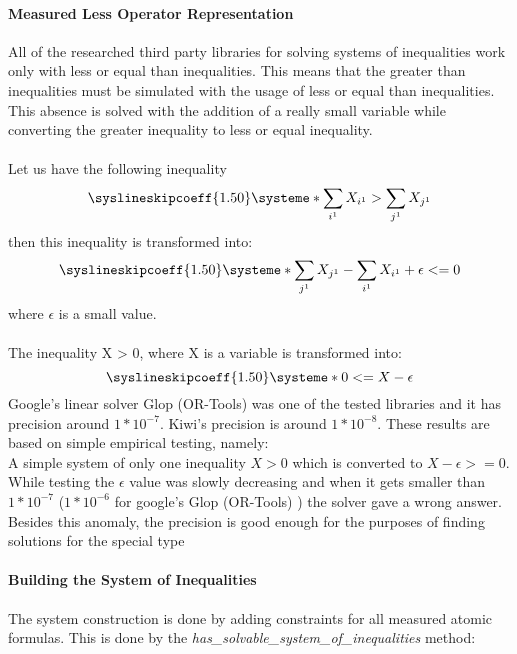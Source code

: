 \documentclass{article}
\begin{document}
	\paragraph{Measured Less Operator Representation}
	All of the researched third party libraries for solving systems of inequalities work only with less or equal than inequalities.
		This means that the greater than inequalities must be simulated with the usage of less or equal than inequalities.
		\newline
		This absence is solved with the addition of a really
		small variable while converting the greater inequality to 
		less or equal inequality.
		\\
		\\
		Let us have the following inequality
		\[
			\syslineskipcoeff{1.50}
			\systeme*{\sum_{i^1} X_{i^1} > \sum_{j^1} X_{j^1}}
		\]
		then this inequality is transformed into:
		\[
			\syslineskipcoeff{1.50}
			\systeme*{\sum_{j^1} X_{j^1} - \sum_{i^1} X_{i^1} + \epsilon <= 0}
		\]
		where $\epsilon$ is a small value.
		\\
		\\
		The inequality X > 0, where X is a variable is transformed into:
		\[
			\syslineskipcoeff{1.50}
			\systeme*{0 <= X - \epsilon} 
		\]
		\newline
		Google's linear solver Glop (OR-Tools) was one of the tested libraries and it has precision around $1*10^{-7}$.
		Kiwi's precision is around $1*10^{-8}$. 
		\newline
		These results are based on simple empirical testing, namely:
		\\
		\noindent
		A simple system of only one inequality $X > 0$ which is converted to $X - \epsilon >= 0$. 
		While testing the $\epsilon$ value was slowly decreasing and when it gets smaller than $1*10^{-7}$
		($1*10^{-6}$ for google's Glop (OR-Tools) ) the solver gave a wrong answer.
		\newline
		\newline
		Besides this anomaly, the precision is good enough for the purposes of finding solutions for the special type

	\paragraph{Building the System of Inequalities}
	The system construction is done by adding constraints for all 	
	measured atomic formulas. This is done by the
	\textit{has\_solvable\_system\_of\_inequalities} method:
		
\end{document}
